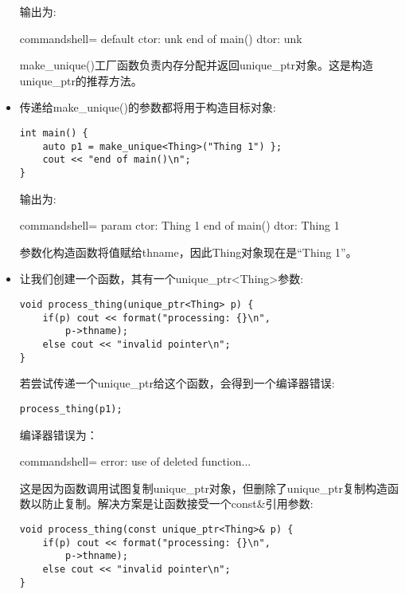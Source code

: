 \begin{itemize}
输出为:

\begin{tcblisting}{commandshell={}}
default ctor: unk
end of main()
dtor: unk
\end{tcblisting}

make\_unique()工厂函数负责内存分配并返回unique\_ptr对象。这是构造unique\_ptr的推荐方法。

\item 
传递给make\_unique()的参数都将用于构造目标对象:

\begin{lstlisting}[style=styleCXX]
int main() {
	auto p1 = make_unique<Thing>("Thing 1") };
	cout << "end of main()\n";
}
\end{lstlisting}

输出为:

\begin{tcblisting}{commandshell={}}
param ctor: Thing 1
end of main()
dtor: Thing 1
\end{tcblisting}

参数化构造函数将值赋给thname，因此Thing对象现在是“Thing 1”。

\item 
让我们创建一个函数，其有一个unique\_ptr<Thing>参数:

\begin{lstlisting}[style=styleCXX]
void process_thing(unique_ptr<Thing> p) {
	if(p) cout << format("processing: {}\n",
		p->thname);
	else cout << "invalid pointer\n";
}
\end{lstlisting}

若尝试传递一个unique\_ptr给这个函数，会得到一个编译器错误:

\begin{lstlisting}[style=styleCXX]
process_thing(p1);
\end{lstlisting}

编译器错误为：

\begin{tcblisting}{commandshell={}}
error: use of deleted function...
\end{tcblisting}

这是因为函数调用试图复制unique\_ptr对象，但删除了unique\_ptr复制构造函数以防止复制。解决方案是让函数接受一个const\&引用参数:

\begin{lstlisting}[style=styleCXX]
void process_thing(const unique_ptr<Thing>& p) {
	if(p) cout << format("processing: {}\n",
		p->thname);
	else cout << "invalid pointer\n";
}
\end{lstlisting}


\end{itemize}
